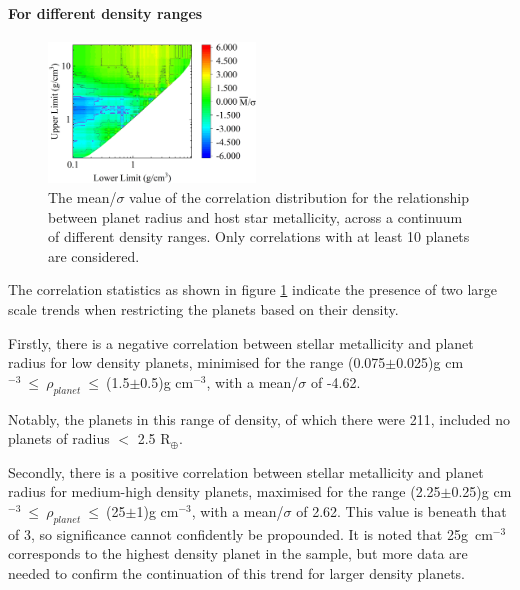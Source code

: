 \documentclass[a4paper,twocolumn,12pt]{article}
\begin{document}
\paragraph{For different density ranges}
\vspace{-1.0em}

\begin{figure}[h!]
    \centering
    \includegraphics[width=0.49\textwidth]{Graphs/FeH vs Radius correlations - Density ranges.png}
    \caption{The mean/$\sigma$ value of the correlation distribution for the relationship between planet radius and host star metallicity, across a continuum of different density ranges. Only correlations with at least 10 planets are considered.}
    \label{figure: Fe/H vs Radius correlations - Density ranges}
\end{figure}
The correlation statistics as shown in figure \ref{figure: Fe/H vs Radius correlations - Density ranges} indicate the presence of two large scale trends when restricting the planets based on their density. %

Firstly, there is a negative correlation between stellar metallicity and planet radius for low density planets, minimised for the range (0.075$\pm$0.025)g cm$^{-3}~\leq~\rho_{planet}~\leq~$(1.5$\pm$0.5)g cm$^{-3}$, with a mean/$\sigma$ of -4.62.

Notably, the planets in this range of density, of which there were 211, included no planets of radius $<$ 2.5 R$_{\oplus}$.

Secondly, there is a positive correlation between stellar metallicity and planet radius for medium-high density planets, maximised for the range (2.25$\pm$0.25)g cm$^{-3}~\leq~\rho_{planet}~\leq~$(25$\pm$1)g cm$^{-3}$, with a mean/$\sigma$ of 2.62. This value is beneath that of 3, so significance cannot confidently be propounded. It is noted that 25g~cm$^{-3}$ corresponds to the highest density planet in the sample, but more data are needed to confirm the continuation of this trend for larger density planets.
\end{document}

